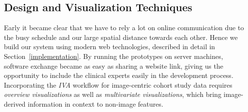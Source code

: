 \documentclass[journal]{style/vgtc} 			          %
\begin{document}
\subsection{Design and Visualization Techniques} \label{Structure and Workflow}
Early it became clear that we have to rely a lot on online communication due to the busy schedule and our large spatial distance towards each other.
%
Hence we build our system using modern web technologies, described in detail in Section~\ref{implementation}.
%
By running the prototypes on server machines, software exchange became as easy as sharing a website link, giving us the opportunity to include the clinical experts easily in the development process.
%
Incorporating the \emph{IVA} workflow for image-centric cohort study data requires \emph{overview visualizations} as well as \emph{multivariate visualizations}, which bring image-derived information in context to non-image features.
\end{document}
